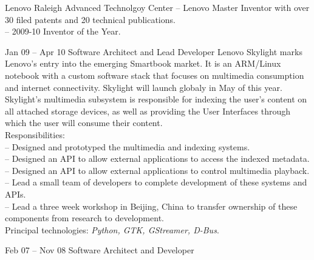 \documentclass[letterpaper, 11pt]{article}
\begin{document}
    \begin{resume}
        \begin{block}
            \begin{category}{Lenovo}
                 {Raleigh Advanced Technolgoy Center}
                -- Lenovo Master Inventor with over 30 filed patents and 20 technical publications. \\
                -- 2009-10 Inventor of the Year. \\
            \end{category}
            \begin{subcategory}{Jan 09 -- Apr 10}
                 {Software Architect and Lead Developer}
                Lenovo Skylight marks Lenovo's entry into the emerging Smartbook market.
                It is an ARM/Linux notebook with a custom software stack that focuses
                on multimedia consumption and internet connectivity.  Skylight will launch
                globaly in May of this year.
                \\[1ex]
                Skylight's multimedia subsystem is responsible for indexing the user's content on all
                attached storage devices, as well as providing the User Interfaces through which
                the user will consume their content.
                \\[1ex]
                Responsibilities: \\
                -- Designed and prototyped the multimedia and indexing systems. \\
                -- Designed an API to allow external applications to access the indexed metadata. \\
                -- Designed an API to allow external applications to control multimedia playback. \\
                -- Lead a small team of developers to complete development of these systems and APIs. \\
                -- Lead a three week workshop in Beijing, China to transfer ownership of these components from research to development.
                \\[1ex]
                Principal technologies: \emph{Python, GTK, GStreamer, D-Bus}.
                \bigskip
            \end{subcategory}
            \begin{subcategory}{Feb 07 -- Nov 08}
                 {Software Architect and Developer}

\end{subcategory}
\end{block}
\end{resume}
\end{document}

